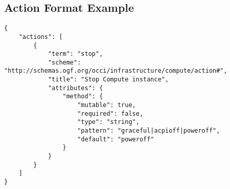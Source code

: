 \documentclass[10pt,a4paper]{article}
\begin{document}
\subsection{Action Format Example}
\label{sec:example_action}

\begin{verbatim}
{
    "actions": [
        {
            "term": "stop",
            "scheme": "http://schemas.ogf.org/occi/infrastructure/compute/action#",
            "title": "Stop Compute instance",
            "attributes": {
                "method": {
                    "mutable": true,
                    "required": false,
                    "type": "string",
                    "pattern": "graceful|acpioff|poweroff",
                    "default": "poweroff"
                }
            }
        }
    ]
}
\end{verbatim}
\end{document}
